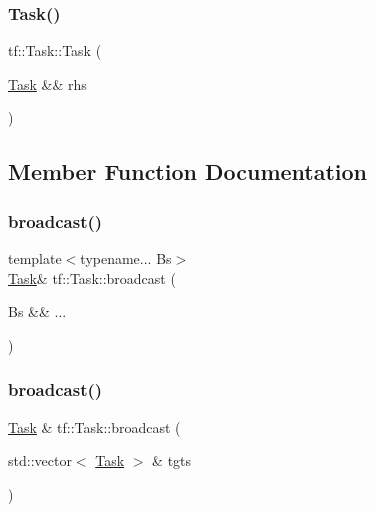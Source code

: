 \mbox{\label{classtf_1_1Task_a4783415f1b49195d34d94def88db5414}} 
\subsubsection{\texorpdfstring{Task()}{Task()}\hspace{0.1cm}{\footnotesize\ttfamily [4/4]}}
{\footnotesize\ttfamily tf\+::\+Task\+::\+Task (\begin{DoxyParamCaption}\item[{\hyperlink{classtf_1_1Task}{Task} \&\&}]{rhs }\end{DoxyParamCaption})\hspace{0.3cm}{\ttfamily [inline]}}



\subsection{Member Function Documentation}
\mbox{\label{classtf_1_1Task_a93623de40d7be63008959a0b4dc27e0c}} 
\subsubsection{\texorpdfstring{broadcast()}{broadcast()}\hspace{0.1cm}{\footnotesize\ttfamily [1/4]}}
{\footnotesize\ttfamily template$<$typename... Bs$>$ \\
\hyperlink{classtf_1_1Task}{Task}\& tf\+::\+Task\+::broadcast (\begin{DoxyParamCaption}\item[{Bs \&\&}]{... }\end{DoxyParamCaption})}

\mbox{\label{classtf_1_1Task_a533af3422ab292aaa80d55fb2870549d}} 
\subsubsection{\texorpdfstring{broadcast()}{broadcast()}\hspace{0.1cm}{\footnotesize\ttfamily [2/4]}}
{\footnotesize\ttfamily \hyperlink{classtf_1_1Task}{Task} \& tf\+::\+Task\+::broadcast (\begin{DoxyParamCaption}\item[{std\+::vector$<$ \hyperlink{classtf_1_1Task}{Task} $>$ \&}]{tgts }\end{DoxyParamCaption})\hspace{0.3cm}{\ttfamily [inline]}}

